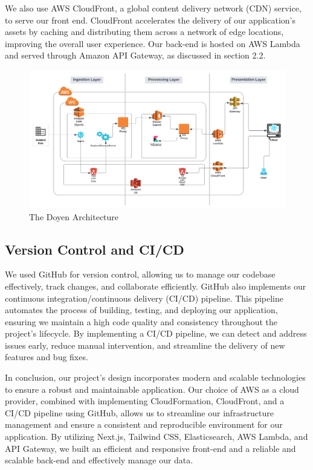 We also use AWS CloudFront, a global content delivery network (CDN) service, to serve our front end. CloudFront accelerates the delivery of our application's assets by caching and distributing them across a network of edge locations, improving the overall user experience.
Our back-end is hosted on AWS Lambda and served through Amazon API Gateway, as discussed in section 2.2.

\begin{figure}[htp]
    \centering
    \includegraphics[width=\textwidth]{Images/Doyen High-Level Architecture Diagram.png}
    \caption{The Doyen Architecture}
    \label{fig:architecture}
\end{figure}

\subsection{Version Control and CI/CD}

We used GitHub for version control, allowing us to manage our codebase effectively, track changes, and collaborate efficiently. GitHub also implements our continuous integration/continuous delivery (CI/CD) pipeline. This pipeline automates the process of building, testing, and deploying our application, ensuring we maintain a high code quality and consistency throughout the project's lifecycle. By implementing a CI/CD pipeline, we can detect and address issues early, reduce manual intervention, and streamline the delivery of new features and bug fixes.

In conclusion, our project's design incorporates modern and scalable technologies to ensure a robust and maintainable application. Our choice of AWS as a cloud provider, combined with implementing CloudFormation, CloudFront, and a CI/CD pipeline using GitHub, allows us to streamline our infrastructure management and ensure a consistent and reproducible environment for our application. By utilizing Next.js, Tailwind CSS, Elasticsearch, AWS Lambda, and API Gateway, we built an efficient and responsive front-end and a reliable and scalable back-end and effectively manage our data.